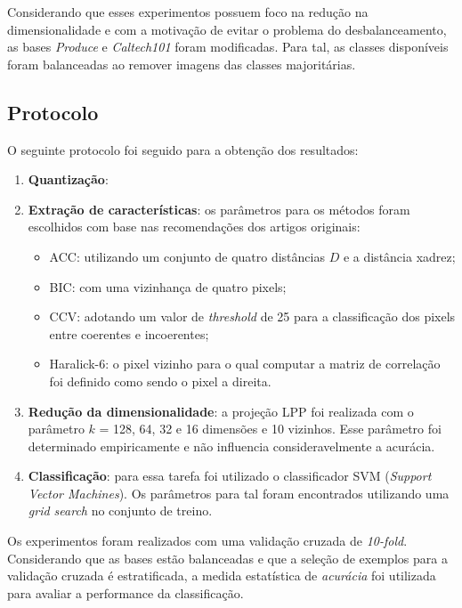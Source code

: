 Considerando que esses experimentos possuem foco na redução na dimensionalidade e com a motivação de evitar o problema do desbalanceamento, as bases \textit{Produce} e \textit{Caltech101} foram modificadas. Para tal, as classes disponíveis foram balanceadas ao remover imagens das classes majoritárias.

\subsection{Protocolo}

O seguinte protocolo foi seguido para a obtenção dos resultados:

\begin{enumerate}
\item \textbf{Quantização}:

\item \textbf{Extração de características}: os parâmetros para os métodos foram escolhidos com base nas recomendações dos artigos originais:
  \begin{itemize}
    \item ACC: utilizando um conjunto de quatro distâncias $D$ e a distância xadrez;
    \item BIC: com uma vizinhança de quatro pixels;
    \item CCV: adotando um valor de \textit{threshold} de 25 para a classificação dos pixels entre coerentes e incoerentes;
    \item Haralick-6: o pixel vizinho para o qual computar a matriz de correlação foi definido como sendo o pixel a direita.
  \end{itemize}
\item \textbf{Redução da dimensionalidade}: a projeção LPP foi realizada com o parâmetro $k$ = 128, 64, 32 e 16 dimensões e 10 vizinhos. Esse parâmetro foi determinado empiricamente e não influencia consideravelmente a acurácia.
\item \textbf{Classificação}: para essa tarefa foi utilizado o classificador SVM (\textit{Support Vector Machines}). Os parâmetros para tal foram encontrados utilizando uma \textit{grid search} no conjunto de treino.
\end{enumerate}

Os experimentos foram realizados com uma validação cruzada de \textit{10-fold}. Considerando que as bases estão balanceadas e que a seleção de exemplos para a validação cruzada é estratificada, a medida estatística de \textit{acurácia} foi utilizada para avaliar a performance da classificação.

